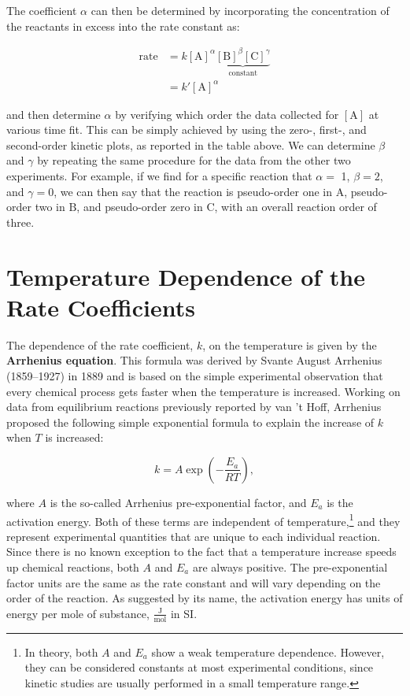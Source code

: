 \documentclass[
  9pt,
]{extbook}
\theoremstyle{definition}
\theoremstyle{definition}
\theoremstyle{definition}
\theoremstyle{remark}
\begin{document}
The coefficient \(\alpha\) can then be determined by incorporating the concentration of the reactants in excess into the rate constant as:

\begin{equation}
\begin{aligned}
\text{rate}&=k[\mathrm{A}]^{\alpha}\underbrace{[\mathrm{B}]^{\beta}[\mathrm{C}]^{\gamma}}_{\text{constant}} \\
&= k'[\mathrm{A}]^{\alpha}
\end{aligned}
\end{equation}

and then determine \(\alpha\) by verifying which order the data collected for \([\mathrm{A}]\) at various time fit. This can be simply achieved by using the zero-, first-, and second-order kinetic plots, as reported in the table above. We can determine \(\beta\) and \(\gamma\) by repeating the same procedure for the data from the other two experiments. For example, if we find for a specific reaction that \(\alpha=\) 1, \(\beta=2\), and \(\gamma=0\), we can then say that the reaction is pseudo-order one in \(\mathrm{A}\), pseudo-order two in \(\mathrm{B}\), and pseudo-order zero in \(\mathrm{C}\), with an overall reaction order of three.

\hypertarget{temperature-dependence-of-the-rate-coefficients}{%
\section{Temperature Dependence of the Rate Coefficients}\label{temperature-dependence-of-the-rate-coefficients}}

The dependence of the rate coefficient, \(k\), on the temperature is given by the \textbf{Arrhenius equation}. This formula was derived by Svante August Arrhenius (1859--1927) in 1889 and is based on the simple experimental observation that every chemical process gets faster when the temperature is increased. Working on data from equilibrium reactions previously reported by van 't Hoff, Arrhenius proposed the following simple exponential formula to explain the increase of \(k\) when \(T\) is increased:

\begin{equation}
k=A\exp\left( -\frac{E_a}{RT}\right),
\label{eq:Arr1}
\end{equation}

where \(A\) is the so-called Arrhenius pre-exponential factor, and \(E_a\) is the activation energy. Both of these terms are independent of temperature,\footnote{In theory, both \(A\) and \(E_a\) show a weak temperature dependence. However, they can be considered constants at most experimental conditions, since kinetic studies are usually performed in a small temperature range.} and they represent experimental quantities that are unique to each individual reaction. Since there is no known exception to the fact that a temperature increase speeds up chemical reactions, both \(A\) and \(E_a\) are always positive. The pre-exponential factor units are the same as the rate constant and will vary depending on the order of the reaction. As suggested by its name, the activation energy has units of energy per mole of substance, \(\frac{\mathrm{J}}{\mathrm{mol}}\) in SI.
\end{document}
